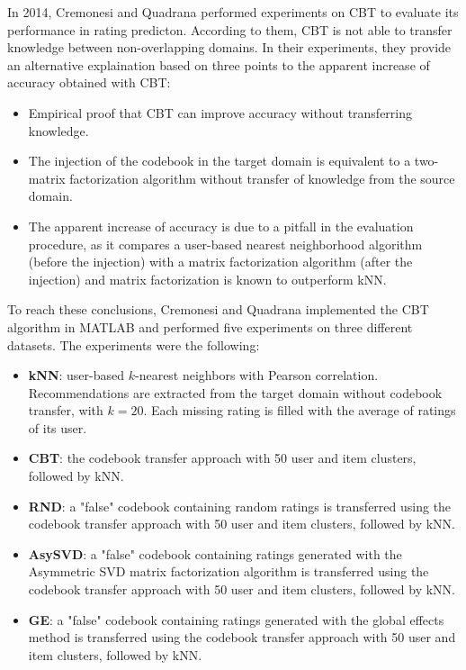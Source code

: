 In 2014, Cremonesi and Quadrana \cite{10.1145/2645710.2645769} performed experiments on CBT to evaluate its performance in rating predicton. According to them, CBT is not able to transfer knowledge between non-overlapping domains. In their experiments, they provide an alternative explaination based on three points to the apparent increase of accuracy obtained with CBT:
\begin{itemize}
\item Empirical proof that CBT can improve accuracy without transferring knowledge.
\item The injection of the codebook in the target domain is equivalent to a two-matrix factorization algorithm without transfer of knowledge from the source domain.
\item The apparent increase of accuracy is due to a pitfall in the evaluation procedure, as it compares a user-based nearest neighborhood algorithm (before the injection) with a matrix factorization algorithm (after the injection) and matrix factorization is known to outperform kNN.
\end{itemize}
To reach these conclusions, Cremonesi and Quadrana implemented the CBT algorithm in MATLAB and performed five experiments on three different datasets. The experiments were the following:
\begin{itemize}
\item \textbf{kNN}: user-based $k$-nearest neighbors with Pearson correlation. Recommendations are extracted from the target domain without codebook transfer, with $k = 20$. Each missing rating is filled with the average of ratings of its user.
\item \textbf{CBT}: the codebook transfer approach with 50 user and item clusters, followed by kNN.
\item \textbf{RND}: a "false" codebook containing random ratings is transferred using the codebook transfer approach with 50 user and item clusters, followed by kNN.
\item \textbf{AsySVD}: a "false" codebook containing ratings generated with the Asymmetric SVD matrix factorization algorithm \cite{10.1145/1401890.1401944} is transferred using the codebook transfer approach with 50 user and item clusters, followed by kNN.
\item \textbf{GE}: a "false" codebook containing ratings generated with the global effects method \cite{10.1145/1401890.1401944} is transferred using the codebook transfer approach with 50 user and item clusters, followed by kNN.
\end{itemize}


